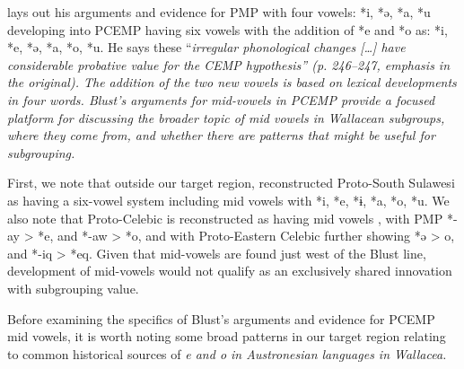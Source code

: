 \citet[247--249]{Blust1993} lays out his arguments
and evidence for PMP with four vowels: *i,
*ə, *a, *u developing into PCEMP having six vowels with the addition
of *e and *o as: *i,
*e, *ə, *a, *o, *u.
He says these “\it{irregular} phonological changes [{\ldots}]
have considerable probative value for the CEMP hypothesis” (p. 246--247,
emphasis in the original).
The addition of the two new vowels is based on lexical developments in four words.
Blust’s arguments for mid-vowels in PCEMP provide a focused platform
for discussing the broader topic of mid vowels in Wallacean subgroups,
where they come from,
and whether there are patterns that might be useful for subgrouping.

First, we note that outside our target region,
\citet{Mills1975} reconstructed Proto-South Sulawesi as having
a six-vowel system including mid vowels with *i,
*e, *ɨ, *a, *o, *u.
We also note that Proto-Celebic is reconstructed as having mid
vowels \citep{Mead2003a,Mead2003b}, with PMP *-ay > *e,
and *-aw > *o,
and with Proto-Eastern Celebic further showing *ə > o,
and *-iq > *eq.
Given that mid-vowels are found just west of the Blust line,
development of mid-vowels would not qualify as
an exclusively shared innovation with subgrouping value. 

Before examining the specifics of Blust’s arguments
and evidence for PCEMP mid vowels,
it is worth noting some broad patterns in our target region relating
to common historical sources of \it{e}
and \it{o} in Austronesian languages in Wallacea.

